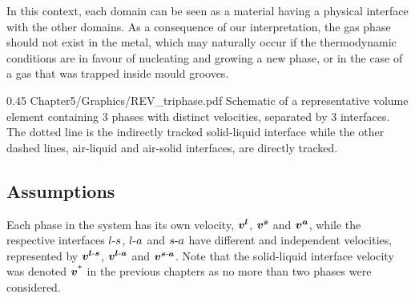 In this context, each domain can be seen as a material having a physical
interface with the other domains. As a consequence of our interpretation, 
the gas phase should not exist in the metal, which may naturally
occur if the thermodynamic conditions are in favour of nucleating and growing 
a new phase, or in the case of a gas that was trapped inside mould grooves.
\begin{figureth}
{0.45}
{Chapter5/Graphics/REV_triphase.pdf}
{Schematic of a representative volume element containing 3 phases with distinct velocities, separated by 3 interfaces.
The dotted line is the indirectly tracked solid-liquid interface while the other dashed lines, air-liquid and air-solid
interfaces, are directly tracked.}
\label{fig:rev_triphase}
\end{figureth}

\subsection{Assumptions}
Each phase in the system has its own velocity, $\boldsymbol{v^l}$, $\boldsymbol{v^s}$ and $\boldsymbol{v^a}$, while the respective
interfaces $l\text{-}s$, $l\text{-}a$ and $s\text{-}a$ have different and independent velocities, 
represented by $\boldsymbol{v^{l\text{-}s}}$, $\boldsymbol{v^{l\text{-}a}}$ and $\boldsymbol{v^{s\text{-}a}}$. Note that the solid-liquid interface
velocity was denoted $\boldsymbol{v^\text{*}}$ in the previous chapters as no more than two phases were considered.

